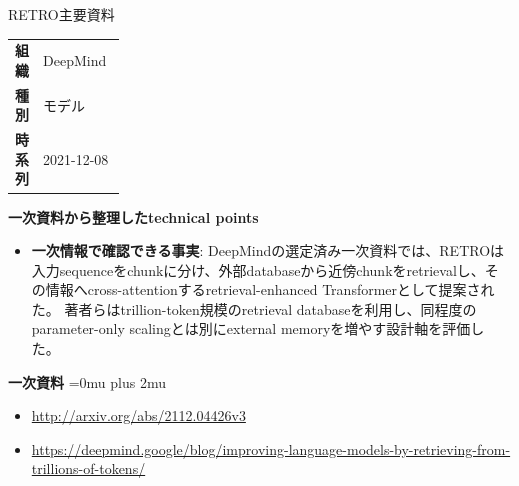 \begin{technicalnote}{RETRO}{主要資料}
\begingroup
\begin{tabularx}{\linewidth}{@{}>{\bfseries}p{0.22\linewidth}X@{}}
組織 & DeepMind \\
種別 & モデル \\
時系列 & 2021-12-08 \\
\end{tabularx}
\smallskip
{\bfseries 一次資料から整理したtechnical points}
\begin{itemize}[leftmargin=1.5em,itemsep=0.35em]
\item \textbf{一次情報で確認できる事実}: DeepMindの選定済み一次資料では、RETROは入力sequenceをchunkに分け、外部databaseから近傍chunkをretrievalし、その情報へcross-attentionするretrieval-enhanced Transformerとして提案された。 著者らはtrillion-token規模のretrieval databaseを利用し、同程度のparameter-only scalingとは別にexternal memoryを増やす設計軸を評価した。
\end{itemize}
\begin{minipage}{\linewidth}
\begin{samepage}
{\bfseries 一次資料}
\begingroup\sloppy
\Urlmuskip=0mu plus 2mu\relax
\begin{itemize}[leftmargin=1.5em,itemsep=0.25em]
\item {\scriptsize\url{http://arxiv.org/abs/2112.04426v3}}
\item {\scriptsize\url{https://deepmind.google/blog/improving-language-models-by-retrieving-from-trillions-of-tokens/}}
\end{itemize}
\endgroup
\end{samepage}
\end{minipage}
\endgroup
\end{technicalnote}
\medskip


